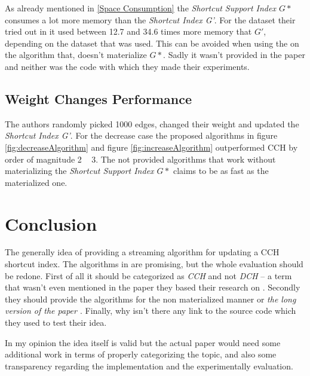 \documentclass[twocolumn]{article}
\begin{document}
As already mentioned in \ref{Space Consumption} the \textit{Shortcut Support Index $G*$} consumes a lot more memory than 
the \textit{Shortcut Index G'}. For the dataset their tried out in \cite{Ouyang2020} it used between 12.7 and 34.6 times more
memory that $G'$, depending on the dataset that was used. This can be avoided when using the on the algorithm that, doesn't 
materialize $G*$. Sadly it wasn't provided in the paper and neither was the code with which they made their experiments.

\subsection{Weight Changes Performance}

The authors randomly picked 1000 edges, changed their weight and updated the \textit{Shortcut Index G'}. For the decrease case 
the proposed algorithms in figure \ref{fig:decreaseAlgorithm} and figure \ref{fig:increaseAlgorithm} outperformed 
CCH by order of magnitude 2 ~ 3. The not provided algorithms that work without materializing the \textit{Shortcut Support Index $G*$}
claims to be as fast as the materialized one.

\section{Conclusion}

The generally idea of providing a streaming algorithm for updating a CCH shortcut index. The algorithms in \cite{Ouyang2020} are
promising, but the whole evaluation should be redone. First of all it should be categorized as \textit{CCH} and not \textit{DCH} – a term that
wasn't even mentioned in the paper they based their research on \cite{Geisberger2012}. Secondly they should provide the 
algorithms for the non materialized manner or \textit{the long version of the paper \cite{Ouyang2020}}. Finally, why isn't there
any link to the source code which they used to test their idea.

In my opinion the idea itself is valid but the actual paper would need some additional work in terms of properly categorizing the topic,
and also some transparency regarding the implementation and the experimentally evaluation.
\clearpage



\listoffigures
\end{document}
